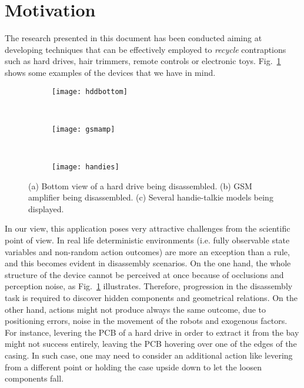 \documentclass[../root.tex]{subfiles}
\begin{document}
\section{Motivation}

The research presented in this document has been conducted aiming at
developing techniques that can be effectively employed to \emph{recycle}
contraptions such as hard drives, hair trimmers, remote controls or
electronic toys. Fig.~\ref{fig:examples-of-devices} shows some
examples of the devices that we have in mind.

\begin{figure}[tbhp]
	\centering
	\begin{subfigure}[b]{0.31\columnwidth}
		\texttt{[image: hddbottom]}
		\caption{}
	\end{subfigure}
	~
	\begin{subfigure}[b]{0.31\columnwidth}
		\texttt{[image: gsmamp]}
		\caption{}
	\end{subfigure}
	~
	\begin{subfigure}[b]{0.31\columnwidth}
		\texttt{[image: handies]}
		\caption{}
	\end{subfigure}
	\caption{
		(a) Bottom view of a hard drive being disassembled.
		(b) GSM amplifier being disassembled.
		(c) Several handie-talkie models being displayed.
	}
	\label{fig:examples-of-devices}
\end{figure}

In our view, this application poses very attractive challenges
from the scientific point of view. In real life deterministic environments
(i.e. fully observable state variables and non-random action outcomes)
are more an exception than a rule, and this becomes evident in disassembly
scenarios. On the one hand, the whole structure of the device cannot be
perceived at once because of occlusions and perception noise, as
Fig.~\ref{fig:examples-of-devices} illustrates. Therefore, progression
in the disassembly task is required to discover hidden components and
geometrical relations. On the other hand, actions might not produce
always the same outcome, due to positioning errors, noise in the movement
of the robots and exogenous factors. For instance, levering the PCB
of a hard drive in order to extract it from the bay might not success
entirely, leaving the PCB hovering over one of the edges of the casing.
In such case, one may need to consider an additional action like levering
from a different point or holding the case upside down to let the loosen
components fall.
\end{document}
